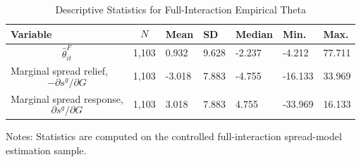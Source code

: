 \begin{table}[H]\centering
\begin{threeparttable}
\caption{Descriptive Statistics for Full-Interaction Empirical Theta}
\label{tab:theta_descriptive_stats}
\scriptsize
\begin{tabularx}{\textwidth}{lYYYYYY}
\toprule
Variable & $$N$$ & Mean & SD & Median & Min. & Max. \\
\midrule
$$\widehat{\theta}^{F}_{it}$$ & 1,103 & 0.932 & 9.628 & -2.237 & -4.212 & 77.711 \\
Marginal spread relief, $$-\partial s^g/\partial G$$ & 1,103 & -3.018 & 7.883 & -4.755 & -16.133 & 33.969 \\
Marginal spread response, $$\partial s^g/\partial G$$ & 1,103 & 3.018 & 7.883 & 4.755 & -33.969 & 16.133 \\
\bottomrule
\end{tabularx}
\begin{tablenotes}[flushleft]\footnotesize
\item Notes: Statistics are computed on the controlled full-interaction spread-model estimation sample.
\end{tablenotes}
\end{threeparttable}
\end{table}
